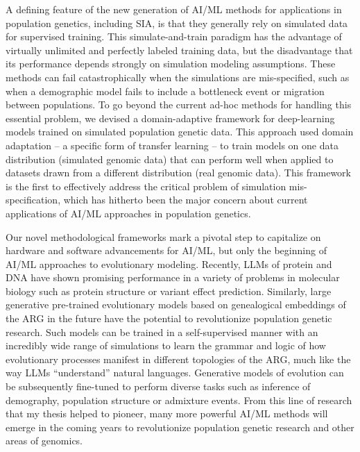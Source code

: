 A defining feature of the new generation of \ac{AI}/\ac{ML} methods for applications in population genetics, including \ac{SIA}, is that they generally rely on simulated data for supervised training. This simulate-and-train paradigm has the advantage of virtually unlimited and perfectly labeled training data, but the disadvantage that its performance depends strongly on simulation modeling assumptions. These methods can fail catastrophically when the simulations are mis-specified, such as when a demographic model fails to include a bottleneck event or migration between populations. To go beyond the current ad-hoc methods for handling this essential problem, we devised a domain-adaptive framework for deep-learning models trained on simulated population genetic data. This approach used domain adaptation – a specific form of transfer learning – to train models on one data distribution (simulated genomic data) that can perform well when applied to datasets drawn from a different distribution (real genomic data). This framework is the first to effectively address the critical problem of simulation mis-specification, which has hitherto been the major concern about current applications of AI/ML approaches in population genetics.

Our novel methodological frameworks mark a pivotal step to capitalize on hardware and software advancements for AI/ML, but only the beginning of \ac{AI}/\ac{ML} approaches to evolutionary modeling. Recently, \acp{LLM} of protein and DNA have shown promising performance in a variety of problems in molecular biology such as protein structure or variant effect prediction. Similarly, large generative pre-trained evolutionary models based on genealogical embeddings of the \ac{ARG} in the future have the potential to revolutionize population genetic research. Such models can be trained in a self-supervised manner with an incredibly wide range of simulations to learn the grammar and logic of how evolutionary processes manifest in different topologies of the \ac{ARG}, much like the way \acp{LLM} “understand” natural languages. Generative models of evolution can be subsequently fine-tuned to perform diverse tasks such as inference of demography, population structure or admixture events. From this line of research that my thesis helped to pioneer, many more powerful \ac{AI}/\ac{ML} methods will emerge in the coming years to revolutionize population genetic research and other areas of genomics.